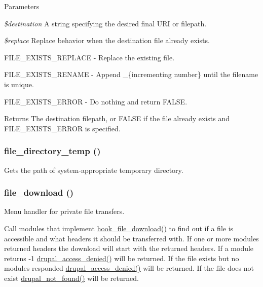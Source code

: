 \begin{DoxyParams}{Parameters}
\item[{\em \$destination}]A string specifying the desired final URI or filepath. \item[{\em \$replace}]Replace behavior when the destination file already exists.
\begin{DoxyItemize}
\item FILE\_\-EXISTS\_\-REPLACE -\/ Replace the existing file.
\item FILE\_\-EXISTS\_\-RENAME -\/ Append \_\-\{incrementing number\} until the filename is unique.
\item FILE\_\-EXISTS\_\-ERROR -\/ Do nothing and return FALSE.
\end{DoxyItemize}\end{DoxyParams}
\begin{DoxyReturn}{Returns}
The destination filepath, or FALSE if the file already exists and FILE\_\-EXISTS\_\-ERROR is specified. 
\end{DoxyReturn}
\hypertarget{group__file_ga250e5cfba54030ab1e5f031608860e42}{
\subsubsection[{file\_\-directory\_\-temp}]{\setlength{\rightskip}{0pt plus 5cm}file\_\-directory\_\-temp ()}}
\label{group__file_ga250e5cfba54030ab1e5f031608860e42}
Gets the path of system-\/appropriate temporary directory. \hypertarget{group__file_ga91226299fab7e95a673f6461bbc19b02}{
\subsubsection[{file\_\-download}]{\setlength{\rightskip}{0pt plus 5cm}file\_\-download ()}}
\label{group__file_ga91226299fab7e95a673f6461bbc19b02}
Menu handler for private file transfers.

Call modules that implement \hyperlink{group__hooks_gab73f0e658d6630220ba7836ccd011ecc}{hook\_\-file\_\-download()} to find out if a file is accessible and what headers it should be transferred with. If one or more modules returned headers the download will start with the returned headers. If a module returns -\/1 \hyperlink{group__http__handling_ga0bbff371f9373002e71f2e1347fcf481}{drupal\_\-access\_\-denied()} will be returned. If the file exists but no modules responded \hyperlink{group__http__handling_ga0bbff371f9373002e71f2e1347fcf481}{drupal\_\-access\_\-denied()} will be returned. If the file does not exist \hyperlink{group__http__handling_ga52b08cd98e1756326c1bd5b56c39a884}{drupal\_\-not\_\-found()} will be returned.

